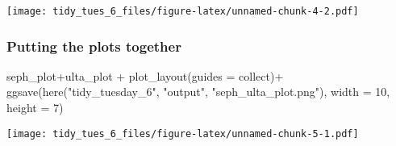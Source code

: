 \documentclass[
]{article}
\newenvironment{Shaded}{\begin{snugshade}}{\end{snugshade}}
\newcommand{\AttributeTok}[1]{\textcolor[rgb]{0.77,0.63,0.00}{#1}}
\newcommand{\DecValTok}[1]{\textcolor[rgb]{0.00,0.00,0.81}{#1}}
\newcommand{\FunctionTok}[1]{\textcolor[rgb]{0.00,0.00,0.00}{#1}}
\newcommand{\NormalTok}[1]{#1}
\newcommand{\SpecialCharTok}[1]{\textcolor[rgb]{0.00,0.00,0.00}{#1}}
\newcommand{\StringTok}[1]{\textcolor[rgb]{0.31,0.60,0.02}{#1}}
\begin{document}
\texttt{[image: tidy\_tues\_6\_files/figure-latex/unnamed-chunk-4-2.pdf]}

\hypertarget{putting-the-plots-together}{%
\subsubsection{Putting the plots
together}\label{putting-the-plots-together}}

\begin{Shaded}
\begin{Highlighting}[]
\NormalTok{seph\_plot}\SpecialCharTok{+}\NormalTok{ulta\_plot }\SpecialCharTok{+}
  \FunctionTok{plot\_layout}\NormalTok{(}\AttributeTok{guides =} \StringTok{\textquotesingle{}collect\textquotesingle{}}\NormalTok{)}\SpecialCharTok{+}
\FunctionTok{ggsave}\NormalTok{(}\FunctionTok{here}\NormalTok{(}\StringTok{"tidy\_tuesday\_6"}\NormalTok{, }\StringTok{"output"}\NormalTok{, }\StringTok{"seph\_ulta\_plot.png"}\NormalTok{),}
       \AttributeTok{width =} \DecValTok{10}\NormalTok{, }\AttributeTok{height =} \DecValTok{7}\NormalTok{)}
\end{Highlighting}
\end{Shaded}

\texttt{[image: tidy\_tues\_6\_files/figure-latex/unnamed-chunk-5-1.pdf]}
\end{document}
